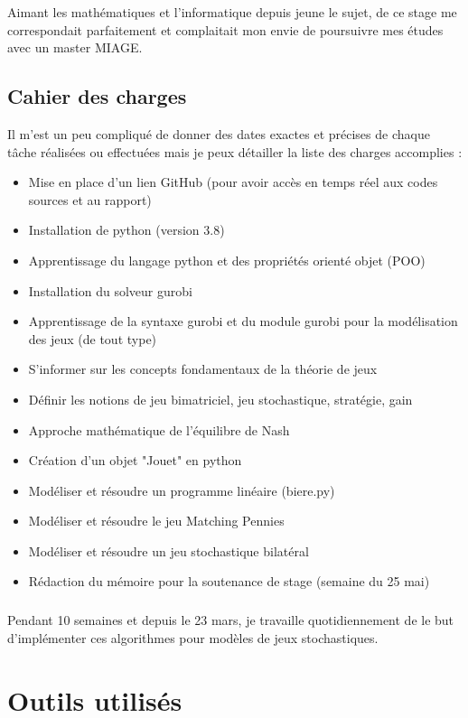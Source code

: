 \documentclass[a4paper, 12pt, twoside]{article}
\begin{document}
Aimant les mathématiques et l'informatique depuis jeune le sujet, de ce stage me correspondait parfaitement et complaitait mon envie de poursuivre mes études avec un master MIAGE.
\subsection{Cahier des charges}
Il m'est un peu compliqué de donner des dates exactes et précises de chaque tâche réalisées ou effectuées mais je peux détailler la liste des charges accomplies : \vspace{0.4 cm}
\begin{itemize}
\item Mise en place d'un lien \textsf{GitHub} (pour avoir accès en temps réel aux codes sources et au rapport)
\item Installation de \textsf{python} (version 3.8)
\item Apprentissage du langage \textsf{python} et des propriétés orienté objet (POO)
\item Installation du solveur \textsf{gurobi}
\item Apprentissage de la syntaxe  \textsf{gurobi} et du module \textsf{gurobi} pour la modélisation des jeux (de tout type)
\item S'informer sur les concepts fondamentaux de la théorie de jeux
\item Définir les notions de jeu bimatriciel, jeu stochastique, stratégie, gain
\item Approche mathématique de \textsf{l'équilibre de Nash}
\item Création d'un objet "Jouet" en \textsf{python}
\item Modéliser et résoudre un programme linéaire (biere.py) 
\item Modéliser et résoudre le jeu \textsf{Matching Pennies}
\item Modéliser et résoudre un jeu \textsf{stochastique bilatéral}
\item Rédaction du mémoire pour la soutenance de stage (semaine du 25 mai)
\end{itemize} 

\subparagraph*{}{Pendant 10 semaines et depuis le 23 mars, je travaille quotidiennement de le but d'implémenter ces algorithmes pour modèles de jeux stochastiques.}
\newpage

\section{Outils utilisés}
\end{document}
